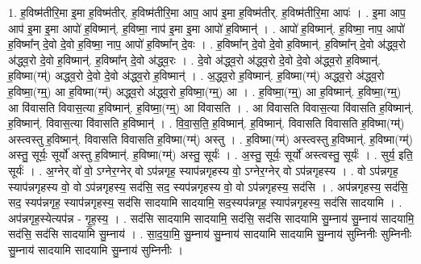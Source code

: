 \documentclass[17pt]{extarticle}
\begin{document}
1. ह॒विष्म॑तीरि॒मा इ॒मा ह॒विष्म॑तीर्. ह॒विष्म॑तीरि॒मा आप॒ आप॑ इ॒मा ह॒विष्म॑तीर्. ह॒विष्म॑तीरि॒मा आपः॑ । . इ॒मा आप॒ आप॑ इ॒मा इ॒मा आपो॑ ह॒विष्मान्॑. ह॒विष्मा॒ नाप॑ इ॒मा इ॒मा आपो॑ ह॒विष्मान्॑ । . आपो॑ ह॒विष्मान्॑. ह॒विष्मा॒ नाप॒ आपो॑ ह॒विष्मा᳚न् दे॒वो दे॒वो ह॒विष्मा॒ नाप॒ आपो॑ ह॒विष्मा᳚न् दे॒वः । . ह॒विष्मा᳚न् दे॒वो दे॒वो ह॒विष्मान्॑. ह॒विष्मा᳚न् दे॒वो अ॑द्ध्व॒रो अ॑द्ध्व॒रो दे॒वो ह॒विष्मान्॑. ह॒विष्मा᳚न् दे॒वो अ॑द्ध्व॒रः । . दे॒वो अ॑द्ध्व॒रो अ॑द्ध्व॒रो दे॒वो दे॒वो अ॑द्ध्व॒रो ह॒विष्मान्॑. ह॒विष्मा(ग्म्॑) अद्ध्व॒रो दे॒वो दे॒वो अ॑द्ध्व॒रो ह॒विष्मान्॑ । . अ॒द्ध्व॒रो ह॒विष्मान्॑. ह॒विष्मा(ग्म्॑) अद्ध्व॒रो अ॑द्ध्व॒रो ह॒विष्मा॒(ग्म्॒) आ ह॒विष्मा(ग्म्॑) अद्ध्व॒रो अ॑द्ध्व॒रो ह॒विष्मा॒(ग्म्॒) आ । . ह॒विष्मा॒(ग्म्॒) आ ह॒विष्मान्॑. ह॒विष्मा॒(ग्म्॒) आ वि॑वासति विवास॒त्या ह॒विष्मान्॑. ह॒विष्मा॒(ग्म्॒) आ वि॑वासति । . आ वि॑वासति विवास॒त्या वि॑वासति ह॒विष्मान्॑. ह॒विष्मान्॑. विवास॒त्या वि॑वासति ह॒विष्मान्॑ । . वि॒वा॒स॒ति॒ ह॒विष्मान्॑. ह॒विष्मान्॑. विवासति विवासति ह॒विष्मा(ग्म्॑) अस्त्वस्तु ह॒विष्मान्॑. विवासति विवासति ह॒विष्मा(ग्म्॑) अस्तु । . ह॒विष्मा(ग्म्॑) अस्त्वस्तु ह॒विष्मान्॑. ह॒विष्मा(ग्म्॑) अस्तु॒ सूर्यः॒ सूर्यो॑ अस्तु ह॒विष्मान्॑. ह॒विष्मा(ग्म्॑) अस्तु॒ सूर्यः॑ । . अ॒स्तु॒ सूर्यः॒ सूर्यो॑ अस्त्वस्तु॒ सूर्यः॑ । . सुर्य॒ इति॒ सूर्यः॑ । . अ॒ग्नेर् वो॑ वो॒ ऽग्नेर॒ग्नेर् वो ऽप॑न्नगृह॒ स्याप॑न्नगृहस्य वो॒ ऽग्नेर॒ग्नेर् वो ऽप॑न्नगृहस्य । . वो ऽप॑न्नगृह॒ स्याप॑न्नगृहस्य वो॒ वो ऽप॑न्नगृहस्य॒ सद॑सि॒ सद॒ स्यप॑न्नगृहस्य वो॒ वो ऽप॑न्नगृहस्य॒ सद॑सि । . अप॑न्नगृहस्य॒ सद॑सि॒ सद॒ स्यप॑न्नगृह॒ स्याप॑न्नगृहस्य॒ सद॑सि सादयामि सादयामि॒ सद॒स्यप॑न्नगृह॒ स्याप॑न्नगृहस्य॒ सद॑सि सादयामि । . अप॑न्नगृह॒स्येत्यप॑न्न - गृ॒ह॒स्य॒ । . सद॑सि सादयामि सादयामि॒ सद॑सि॒ सद॑सि सादयामि सु॒म्नाय॑ सु॒म्नाय॑ सादयामि॒ सद॑सि॒ सद॑सि सादयामि सु॒म्नाय॑ । . सा॒द॒या॒मि॒ सु॒म्नाय॑ सु॒म्नाय॑ सादयामि सादयामि सु॒म्नाय॑ सुम्निनीः सुम्निनीः सु॒म्नाय॑ सादयामि सादयामि सु॒म्नाय॑ सुम्निनीः । \newline
\end{document}
